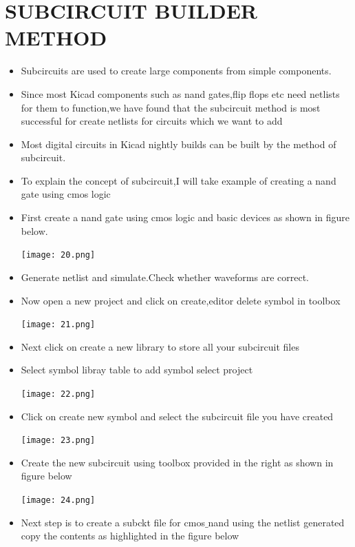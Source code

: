 \documentclass[12pt,a4paper]{  report}
\begin{document}
\section{SUBCIRCUIT BUILDER METHOD}
\begin{itemize}
\item Subcircuits are used to create large components from simple components.
\item Since most Kicad components such as nand gates,flip flops etc need netlists for them to function,we have found that the subcircuit method is most successful for create netlists for circuits which we want to add
\item Most digital circuits in Kicad nightly builds can be built by the method of subcircuit.
\item To explain the concept of subcircuit,I will take example of  creating a nand gate using cmos logic
\item First create a nand gate using cmos logic and basic devices as shown in figure below.
\begin{flushleft}
\texttt{[image: 20.png]}
\end{flushleft}
\item Generate netlist and simulate.Check whether waveforms are correct.
\item Now open a new project and click on create,editor delete symbol in toolbox
\begin{flushleft}
\texttt{[image: 21.png]}
\end{flushleft}
\item Next click on create a new library to store all your subcircuit files
\item Select symbol  libray table to add symbol select project
\begin{flushleft}
\texttt{[image: 22.png]}
\end{flushleft}
\item Click on create new symbol and select the subcircuit file you have created 
\begin{flushleft}
\texttt{[image: 23.png]}
\end{flushleft}
\item Create the new subcircuit using toolbox provided in the right as shown in figure below
 \begin{flushleft}
\texttt{[image: 24.png]}
\end{flushleft}
\item Next step is to create a subckt file for cmos$\_$nand using the netlist generated copy the contents as highlighted in the figure below

\end{itemize}
\end{document}
